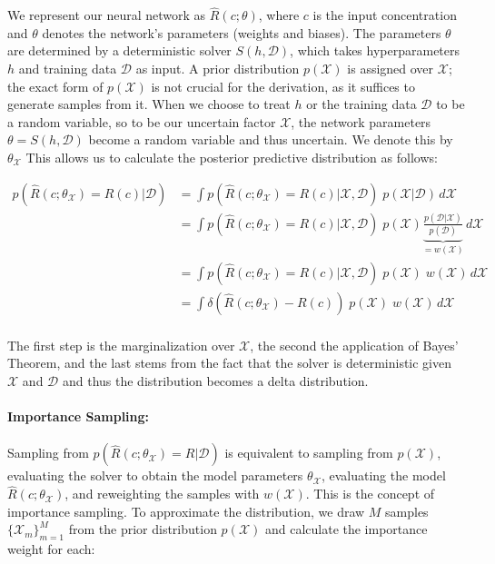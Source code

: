We represent our neural network as $\hat{R}(c; \theta)$, where $c$ is the input concentration and $\theta$ denotes the network's parameters (weights and biases). The parameters $\theta$ are determined by a deterministic solver $S(h, \mathcal{D})$, which takes hyperparameters $h$ and training data $\mathcal{D}$ as input. A prior distribution $p(\mathcal{X})$ is assigned over $\mathcal{X}$; the exact form of $p(\mathcal{X})$ is not crucial for the derivation, as it suffices to generate samples from it.
When we choose to treat $h$ or the training data $\mathcal{D}$ to be a random variable, so to be our uncertain factor $\mathcal{X}$, the network parameters $\theta = S(h, \mathcal{D})$ become a random variable and thus uncertain. We denote this by $\theta_{\mathcal{X}}$ This allows us to calculate the posterior predictive distribution as follows:

\begin{align*}
p(\hat{R}(c; \theta_{\mathcal{X}}) = R(c)| \mathcal{D}) &= \int p(\hat{R}(c; \theta_{\mathcal{X}}) = R(c) | \mathcal{X}, \mathcal{D})\; p(\mathcal{X} | \mathcal{D}) \, d\mathcal{X} \\
                                          &= \int p(\hat{R}(c; \theta_{\mathcal{X}}) = R(c) | \mathcal{X}, \mathcal{D})\; p(\mathcal{X}) \underbrace{\frac{p(\mathcal{D} | \mathcal{X}) }{p(\mathcal{D})}}_{= w(\mathcal{X})} \, d\mathcal{X} \\
                                          &= \int p(\hat{R}(c; \theta_{\mathcal{X}}) = R(c) | \mathcal{X}, \mathcal{D})\; p(\mathcal{X})\; w(\mathcal{X}) \, d\mathcal{X} \\
                                          &= \int \delta(\hat{R}(c; \theta_{\mathcal{X}}) - R(c))\; p(\mathcal{X})\; w(\mathcal{X}) \, d\mathcal{X} \\
\end{align*}

The first step is the marginalization over $\mathcal{X}$, the second the application of Bayes' Theorem, and the last stems from the fact that the solver is deterministic given $\mathcal{X}$ and $\mathcal{D}$ and thus the distribution becomes a delta distribution.


\paragraph{Importance Sampling:}

Sampling from $p(\hat{R}(c; \theta_{\mathcal{X}}) = R| \mathcal{D})$ is equivalent to sampling from $p(\mathcal{X})$, evaluating the solver to obtain the model parameters $\theta_{\mathcal{X}}$, evaluating the model $\hat{R}(c; \theta_{\mathcal{X}})$, and reweighting the samples with $w(\mathcal{X})$. This is the concept of importance sampling. To approximate the distribution, we draw $M$ samples $\{\mathcal{X}_m\}_{m=1}^M$ from the prior distribution $p(\mathcal{X})$ and calculate the importance weight for each:

